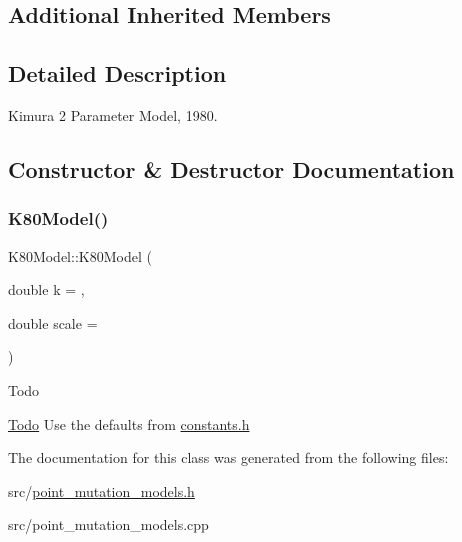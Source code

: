 \subsection*{Additional Inherited Members}


\subsection{Detailed Description}
Kimura 2 Parameter Model, 1980. 

\subsection{Constructor \& Destructor Documentation}
\mbox{\label{classrcombinator_1_1K80Model_a73baeeb9bbddfcd006e4642f28c95411}} 
\subsubsection{\texorpdfstring{K80\+Model()}{K80Model()}}
{\footnotesize\ttfamily K80\+Model\+::\+K80\+Model (\begin{DoxyParamCaption}\item[{double}]{k = {},  }\item[{double}]{scale = {} }\end{DoxyParamCaption})}

\begin{DoxyRefDesc}{Todo}
\item[\mbox{\hyperlink{todo__todo000006}{Todo}}]Use the defaults from \mbox{\hyperlink{constants_8h}{constants.\+h}} \end{DoxyRefDesc}


The documentation for this class was generated from the following files\+:\begin{DoxyCompactItemize}
\item 
src/\mbox{\hyperlink{point__mutation__models_8h}{point\+\_\+mutation\+\_\+models.\+h}}\item 
src/point\+\_\+mutation\+\_\+models.\+cpp\end{DoxyCompactItemize}

